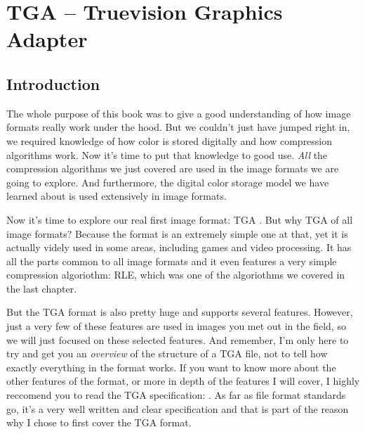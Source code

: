 \begin{comment}
  
\end{comment}

\chapter{TGA -- Truevision Graphics Adapter}
\label{cha:tga}

\begin{refsection}

  \section{Introduction}
  \label{sec:tga-introduction}


  The whole purpose of this book was to give a good understanding of
  how image formats really work under the hood. But we couldn't just
  have jumped right in, we required knowledge of how color is stored
  digitally and how compression algorithms work. Now it's time to put
  that knowledge to good use. \textit{All} the compression algorithms
  we just covered are used in the image formats we are going to
  explore. And furthermore, the digital color storage model we have
  learned about is used extensively in image formats.

  Now it's time to explore our real first image format: TGA
  . But why TGA of all image formats? Because the format is
  an extremely simple one at that, yet it is actually videly used in
  some areas, including games and video processing. It has all the
  parts common to all image formats and it even features a very simple
  compression algoriothm: RLE, which was one of the algoriothms we
  covered in the last chapter.

  But the TGA format is also pretty huge and supports several
  features. However, just a very few of these features are used in
  images you met out in the field, so we will just focused on these
  selected features. And remember, I'm only here to try and get you an
  \textit{overview} of the structure of a TGA file, not to tell how
  exactly everything in the format works. If you want to know more
  about the other features of the format, or more in depth of the
  features I will cover, I highly reccomend you to read the TGA
  specification: \cite{91:_truev_tga_file_format_specif}. As far as
  file format standards go, it's a very well written and clear
  specification and that is part of the reason why I chose to first
  cover the TGA format.


\end{refsection}
